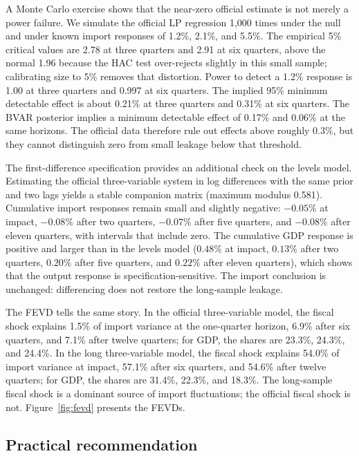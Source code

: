 \documentclass[11pt,a4paper]{article}
\begin{document}
A Monte Carlo exercise shows that the near-zero official estimate is not merely a power failure. We simulate the official LP regression 1,000 times under the null and under known import responses of 1.2\%, 2.1\%, and 5.5\%. The empirical 5\% critical values are 2.78 at three quarters and 2.91 at six quarters, above the normal 1.96 because the HAC test over-rejects slightly in this small sample; calibrating size to 5\% removes that distortion. Power to detect a 1.2\% response is 1.00 at three quarters and 0.997 at six quarters. The implied 95\% minimum detectable effect is about 0.21\% at three quarters and 0.31\% at six quarters. The BVAR posterior implies a minimum detectable effect of 0.17\% and 0.06\% at the same horizons. The official data therefore rule out effects above roughly 0.3\%, but they cannot distinguish zero from small leakage below that threshold.

The first-difference specification provides an additional check on the levels model. Estimating the official three-variable system in log differences with the same prior and two lags yields a stable companion matrix (maximum modulus 0.581). Cumulative import responses remain small and slightly negative: $-0.05\%$ at impact, $-0.08\%$ after two quarters, $-0.07\%$ after five quarters, and $-0.08\%$ after eleven quarters, with intervals that include zero. The cumulative GDP response is positive and larger than in the levels model ($0.48\%$ at impact, $0.13\%$ after two quarters, $0.20\%$ after five quarters, and $0.22\%$ after eleven quarters), which shows that the output response is specification-sensitive. The import conclusion is unchanged: differencing does not restore the long-sample leakage.

The FEVD tells the same story. In the official three-variable model, the fiscal shock explains 1.5\% of import variance at the one-quarter horizon, 6.9\% after six quarters, and 7.1\% after twelve quarters; for GDP, the shares are 23.3\%, 24.3\%, and 24.4\%. In the long three-variable model, the fiscal shock explains 54.0\% of import variance at impact, 57.1\% after six quarters, and 54.6\% after twelve quarters; for GDP, the shares are 31.4\%, 22.3\%, and 18.3\%. The long-sample fiscal shock is a dominant source of import fluctuations; the official fiscal shock is not. Figure~\ref{fig:fevd} presents the FEVDs.

\subsection{Practical recommendation}
\label{sec:recommendation}
\end{document}
